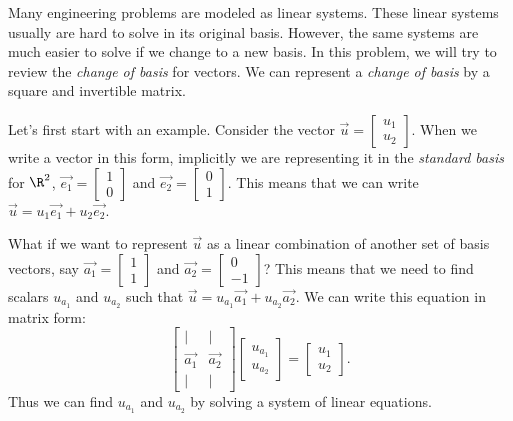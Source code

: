 


Many engineering problems are modeled as linear systems.
These linear systems usually are hard to solve in its original basis.
However, the same systems are much easier to solve if we change to a new basis.
In this problem, we will try to review the \emph{change of basis} for vectors.
We can represent a \emph{change of basis} by a square and invertible matrix.
\par

Let's first start with an example.
Consider the vector $\vec{u} = \begin{bmatrix} u_1 \\ u_2 \end{bmatrix}$.
When we write a vector in this form, implicitly we are representing it in the \emph{standard basis} for $\R^{2}$, $\vec{e_1} = \begin{bmatrix} 1 \\ 0 \end{bmatrix}$ and $\vec{e_2} = \begin{bmatrix} 0 \\ 1 \end{bmatrix}$.
This means that we can write $\vec{u} = u_1\vec{e_1} + u_2\vec{e_2}$.
\par

What if we want to represent $\vec{u}$ as a linear combination of another set of basis vectors, say $\vec{a_1} = \begin{bmatrix} 1 \\ 1 \end{bmatrix}$ and $\vec{a_2} = \begin{bmatrix} 0 \\ -1 \end{bmatrix}$?
This means that we need to find scalars $u_{a_1}$ and $u_{a_2}$ such that $\vec{u} = u_{a_1}\vec{a_1} + u_{a_2}\vec{a_2}$.
We can write this equation in matrix form:
\[
  \begin{bmatrix}
    | & | \\
    \vec{a_1} & \vec{a_2} \\
    | & |
  \end{bmatrix}
  \begin{bmatrix} u_{a_1} \\ u_{a_2} \end{bmatrix} = \begin{bmatrix} u_{1} \\ u_{2} \end{bmatrix}
.\]
Thus we can find $u_{a_1}$ and $u_{a_2}$ by solving a system of linear equations.
\par



